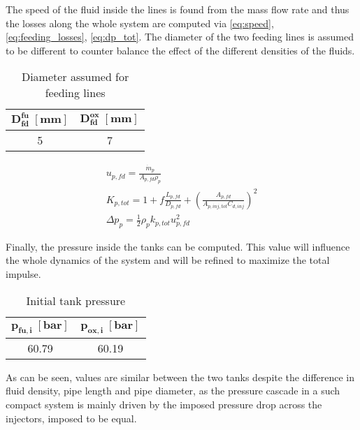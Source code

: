 The speed of the fluid inside the lines is found from the mass flow rate and thus the losses along the whole system are computed via \autoref{eq:speed}, \autoref{eq:feeding_losses}, \autoref{eq:dp_tot}. The diameter of the two feeding lines is assumed to be different to counter balance the effect of the different densities of the fluids.

\begin{table}[H]
    \renewcommand{\arraystretch}{1.4}
    \centering
    \begin{tabular}{|c|c|}
        \hline
        $\boldsymbol{D_{fd}^{fu} \; [\textbf{mm}]}$ & $\boldsymbol{D_{fd}^{ ox} \; [\textbf{mm}]}$ \\
        \hline
        \hline
        5 & 7 \\
        \hline
    \end{tabular}
    \caption{Diameter assumed for feeding lines}
    \label{table:diameter_fd}
\end{table}
\vspace{-1cm}
\begin{gather}
         u_{p,fd} = \frac{\dot{m}_p}{A_{p, fd}\rho_p}
        \label{eq:speed}
        \\
        K_{p, tot} = 1 + f \frac{L_{p,fd}}{D_{p,fd}} + \left(\frac{A_{p, fd}}{A_{p,inj, tot}C_{d,inj}}\right)^2
       \label{eq:feeding_losses}
       \\
       \Delta p_{p} = \frac{1}{2}\rho_p k_{p, tot} u_{p,fd}^2 
       \label{eq:dp_tot}
\end{gather}

Finally, the pressure inside the tanks can be computed. This value will influence the whole dynamics of the system and will be refined to maximize the total impulse.

\begin{table}[H]
    \renewcommand{\arraystretch}{1.4}
    \centering
    \begin{tabular}{|c|c|}
        \hline
        $\boldsymbol{p_{fu,i}} \; [\textbf{bar}]$ & $\boldsymbol{p_{ox,i}\; [\textbf{bar}]}$ \\
        \hline
        \hline
        60.79 & 60.19 \\
        \hline
    \end{tabular}
    \caption{Initial tank pressure}
    \label{table:tk_press}
\end{table}
As can be seen, values are similar between the two tanks despite the difference in fluid density, pipe length and pipe diameter, as the pressure cascade in a such compact system is mainly driven by the imposed pressure drop across the injectors, imposed to be equal.

